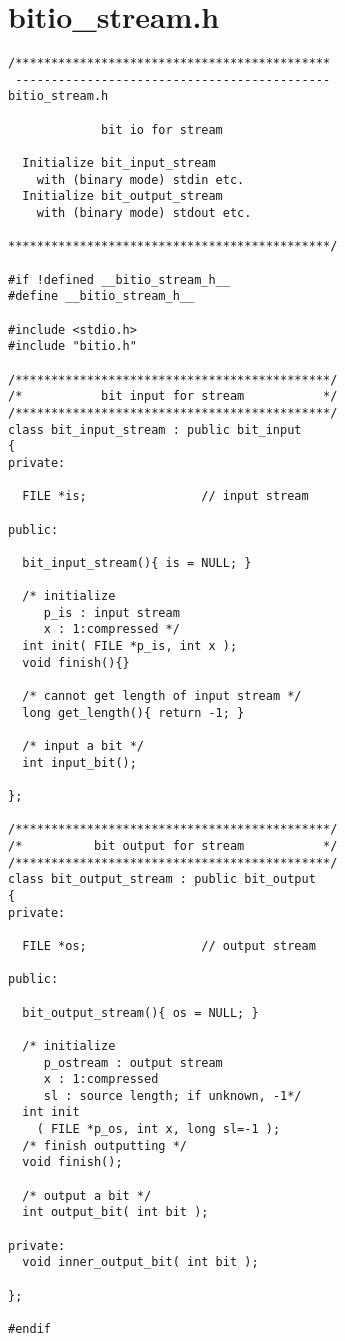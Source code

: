 \section{bitio\_stream.h}
\begin{verbatim}
/********************************************
 --------------------------------------------
bitio_stream.h

             bit io for stream

  Initialize bit_input_stream
    with (binary mode) stdin etc.
  Initialize bit_output_stream
    with (binary mode) stdout etc.

*********************************************/

#if !defined __bitio_stream_h__
#define __bitio_stream_h__

#include <stdio.h>
#include "bitio.h"

/********************************************/
/*           bit input for stream           */
/********************************************/
class bit_input_stream : public bit_input
{
private:

  FILE *is;                // input stream

public:

  bit_input_stream(){ is = NULL; }

  /* initialize
     p_is : input stream
     x : 1:compressed */
  int init( FILE *p_is, int x );
  void finish(){}

  /* cannot get length of input stream */
  long get_length(){ return -1; }

  /* input a bit */
  int input_bit();

};

/********************************************/
/*          bit output for stream           */
/********************************************/
class bit_output_stream : public bit_output
{
private:

  FILE *os;                // output stream

public:

  bit_output_stream(){ os = NULL; }

  /* initialize
     p_ostream : output stream
     x : 1:compressed
     sl : source length; if unknown, -1*/
  int init
    ( FILE *p_os, int x, long sl=-1 );
  /* finish outputting */
  void finish();

  /* output a bit */
  int output_bit( int bit );

private:
  void inner_output_bit( int bit );

};

#endif
\end{verbatim}
